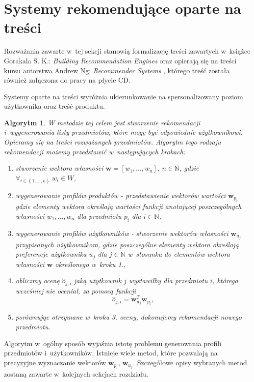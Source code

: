\documentclass[12pt,a4paper]{report}
\newtheorem{algorytm}[df]{Algorytm}
\newcommand{\set}[1]{\left\lbrace {#1} \right\rbrace}
\newcommand{\setN}{\mathbb{N}}
\newcommand{\setWlasnosci}{\mathit{W}}
\begin{document}
\section{Systemy rekomendujące oparte na treści}
Rozważania zawarte w~tej sekcji stanowią formalizację treści zawartych w~książce Gorakala S. K.: \textit{Building Recommendation Engines} {\citep[Sec 3]{bre}} oraz opierają się na treści kursu autorstwa Andrew Ng: \textit{Recommender Systems} {\citep{rs}}, którego treść została również załączona do pracy na płycie CD.
\bigskip

Systemy oparte na treści wyróżnia ukierunkowanie na spersonalizowany poziom użytkownika oraz treść produktu.

\begin{algorytm}
W metodzie tej celem jest stworzenie rekomendacji i~wygenerowania listy przedmiotów, które mogę być odpowiednie użytkownikowi. Opieramy się na treści rozważanych przedmiotów. Algorytm tego rodzaju rekomendacji możemy przedstawić w~następujących krokach:
\begin{enumerate}
\item stworzenie wektora własności $\mathbf{w} = [w_1, \ldots, w_n]$, $n \in \setN$, gdzie $\forall_{i \in \set{1, \ldots, n}} \: w_i \in \setWlasnosci$,

\item wygenerowanie profilów produktów - przedstawienie wektorów wartości $\mathbf{w}_{p_i}$ gdzie elementy wektora określają wartości funkcji anotującej poszczególnych własności $w_1, \ldots, w_n$ dla przedmiotu $p_i$ dla $i \in \setN$,

\item wygenerowanie profilów użytkowników - stworzenie wektorów własności $\mathbf{w}_{u_j}$ przypisanych użytkownikom, gdzie poszczególne elementy wektora określają preferencje użytkownika $u_j$ dla $j \in \setN$ w~stosunku do elementów wektora własności $\mathbf{w}$ określonego w~kroku 1.,

\item obliczmy ocenę $\widehat{o}_{j,i}$ jaką użytkownik $j$ wystawiłby dla przedmiotu $i$, którego wcześniej nie oceniał, za pomocą funkcji
$$
\widehat{o}_{j,i} = \mathbf{w}_{u_j}^T \mathbf{w}_{p_i},
$$

\item porównując otrzymane w~kroku 3. oceny, dokonujemy rekomendacji nowego przedmiotu.
\end{enumerate}
\end{algorytm}


Algorytm w~ogólny sposób wyjaśnia istotę problemu generowania profili przedmiotów i~użytkowników.
Istnieje wiele metod, które pozwalają na precyzyjne wyznaczanie wektorów $\mathbf{w}_{p_i}$, $\mathbf{w}_{u_j}$.
Szczegółowe opisy wybranych metod zostaną zawarte w~kolejnych sekcjach rozdziału.
\end{document}
